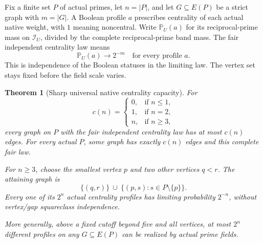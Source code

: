 \documentclass[11pt]{article}
\newtheorem{theorem}{Theorem}[section]
\begin{document}
Fix a finite set \(P\) of actual primes, let \(n=|P|\), and let
\(G\subseteq E(P)\) be a strict graph with \(m=|G|\).
A Boolean profile \(a\) prescribes centrality of each actual native
weight, with \(1\) meaning noncentral.
Write \(\mathbb P_U(a)\) for its reciprocal-prime mass on
\(\mathcal I_U\), divided by the complete reciprocal-prime band mass.
The fair independent centrality law means
\[
                  \mathbb P_U(a)\longrightarrow 2^{-m}
                           \quad\text{for every profile }a.
\]
This is independence of the Boolean statuses in the limiting law.
The vertex set stays fixed before the field scale varies.

\begin{theorem}[Sharp universal native centrality capacity]
\label{thm:native-profile-capacity}
For
\[
 c(n)=
 \begin{cases}
  0,&\text{if }n\leq1,\\
  1,&\text{if }n=2,\\
  n,&\text{if }n\geq3,
 \end{cases}
\]
every graph on \(P\) with the fair independent centrality law has
at most \(c(n)\) edges. For every actual \(P\), some graph has
exactly \(c(n)\) edges and this complete fair law.

For \(n\geq3\), choose the smallest vertex \(p\) and two other
vertices \(q<r\). The attaining graph is
\begin{equation}\label{eq:native-triangle-fan}
             \{(q,r)\}\ \cup\
                    \{(p,s):s\in P\setminus\{p\}\}.
\end{equation}
Every one of its \(2^n\) actual centrality profiles has limiting
probability \(2^{-n}\), without vertex/gap squareclass independence.

More generally, above a fixed cutoff beyond five and all vertices,
at most \(2^n\) different profiles on any \(G\subseteq E(P)\) can
be realized by actual prime fields.
\end{theorem}
\end{document}

